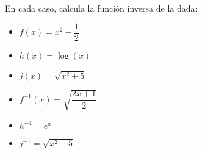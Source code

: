 \vspace{1cm}

\begin{ex}
	En cada caso, calcula la función inversa de la dada:\\
	\begin{itemize}
		\item $f(x) = x^2 -\dfrac{1}{2}$
		\item $h(x) = \log (x)$
		\item $j(x) = \sqrt{x^2+5}$
	\end{itemize}
	\begin{sol}
		\begin{itemize}
			\item $f^{-1}(x) = \sqrt{\dfrac{2x+1}{2}}$
			\item $h^{-1} = e^{x}$
			\item $j^{-1} = \sqrt{x^2-5}$
		\end{itemize}
	\end{sol}
\end{ex}